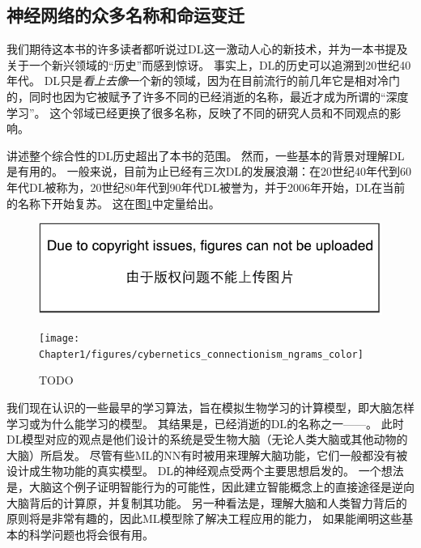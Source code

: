 \subsection{神经网络的众多名称和命运变迁}
\label{sec:the_many_names_and_changing_fortunes_of_neural_networks}

我们期待这本书的许多读者都听说过\gls{DL}这一激动人心的新技术，并为一本书提及关于一个新兴领域的``历史''而感到惊讶。
事实上，\gls{DL}的历史可以追溯到20世纪40年代。
\gls{DL}只是\emph{看上去像}一个新的领域，因为在目前流行的前几年它是相对冷门的，同时也因为它被赋予了许多不同的已经消逝的名称，最近才成为所谓的``深度学习''。
这个邻域已经更换了很多名称，反映了不同的研究人员和不同观点的影响。

讲述整个综合性的\gls{DL}历史超出了本书的范围。
然而，一些基本的背景对理解\gls{DL}是有用的。
一般来说，目前为止已经有三次\gls{DL}的发展浪潮：在20世纪40年代到60年代\gls{DL}被称为，20世纪80年代到90年代\gls{DL}被誉为，并于2006年开始，\gls{DL}在当前的名称下开始复苏。
这在图\ref{fig:chap1_cybernetics_connectionism_ngrams_color}中定量给出。
\begin{figure}[!htb]
\ifOpenSource
\centerline{\includegraphics{figure.pdf}}
\else
\centerline{\texttt{[image: Chapter1/figures/cybernetics\_connectionism\_ngrams\_color]}}
\fi
\caption{TODO}
\label{fig:chap1_cybernetics_connectionism_ngrams_color}
\end{figure}


我们现在认识的一些最早的学习算法，旨在模拟生物学习的计算模型，即大脑怎样学习或为什么能学习的模型。
其结果是，已经消逝的\gls{DL}的名称之一——。
此时\gls{DL}模型对应的观点是他们设计的系统是受生物大脑（无论人类大脑或其他动物的大脑）所启发。
尽管有些\gls{ML}的\gls{NN}有时被用来理解大脑功能\citep{hinton1991lesioning}，它们一般都没有被设计成生物功能的真实模型。
\gls{DL}的神经观点受两个主要思想启发的。
一个想法是，大脑这个例子证明智能行为的可能性，因此建立智能概念上的直接途径是逆向大脑背后的计算原，并复制其功能。
另一种看法是，理解大脑和人类智力背后的原则将是非常有趣的，因此\gls{ML}模型除了解决工程应用的能力， 如果能阐明这些基本的科学问题也将会很有用。 

